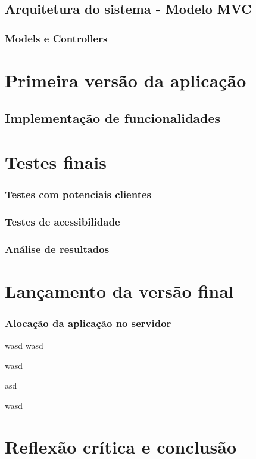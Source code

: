 \documentclass[11pt, twoside]{report}
\begin{document}
	\section{Arquitetura do sistema - Modelo MVC}
	\subsection{Models e Controllers}
	
	\chapter{Primeira versão da aplicação}
	\section{Implementação de funcionalidades}
	
	\chapter{Testes finais}
	\subsection{Testes com potenciais clientes}
	\subsection{Testes de acessibilidade}
	\subsection{Análise de resultados}
	
	\chapter{Lançamento da versão final}
	\subsection{Alocação da aplicação no servidor}
	
	\pagebreak
	wasd
	wasd
	
	
	wasd
	
	
	\pagebreak
	
	asd
	
	wasd
	\chapter{Reflexão crítica e conclusão}
	
	

	
	
	
\end{document}
